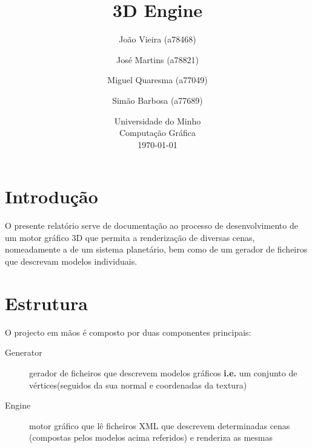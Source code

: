 \documentclass{article}
\begin{document}
\title{\vspace*{\fill}3D Engine}
\author{João Vieira (a78468) \and José Martins (a78821) \and Miguel Quaresma (a77049) \and Simão Barbosa (a77689)}
\date{%
    Universidade do Minho\\
    Computação Gráfica\\[2ex]%
    \today\vspace*{\fill}
}
\maketitle

\newpage

\tableofcontents

\newpage

\section{Introdução}
O presente relatório serve de documentação ao processo de desenvolvimento de um motor gráfico 3D que permita a renderização de diversas cenas, nomeadamente a de um sistema planetário, bem como de um gerador de ficheiros que descrevam modelos individuais.

\newpage

\section{Estrutura}
O projecto em mãos é composto por duas componentes principais: 
\begin{description}
    \item [Generator] gerador de ficheiros que descrevem modelos gráficos \textbf{i.e.} um conjunto de vértices(seguidos da sua normal e coordenadas da textura) 
    \item [Engine] motor gráfico que lê ficheiros XML que descrevem determinadas cenas (compostas pelos modelos acima referidos) e renderiza as mesmas
\end{description}
\end{document}
